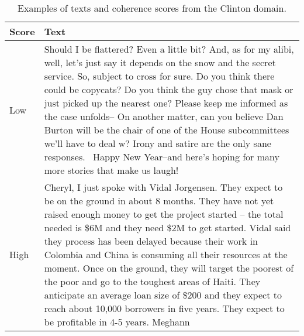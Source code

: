 \documentclass[11pt,a4paper]{article}
\begin{document}
\begin{table*}[htb]
\begin{center}
\begin{footnotesize}
\begin{tabular}{@{}l@{\hspace{1em}}p{14.8cm}@{}}
\toprule
Score & Text \\
\midrule
Low & Should I be flattered? Even a little bit? And, as for my alibi, well, let's just say it depends on the snow and the secret service. So, subject to cross for sure. Do you think there could be copycats? Do you think the guy chose that mask or just picked up the nearest one? Please keep me informed as the case unfolds--
\newline
On another matter, can you believe Dan Burton will be the chair of one of the House subcommittees we'll have to deal w? Irony and satire are the only sane responses.
\newline\
Happy New Year--and here's hoping for many more stories that make us laugh!\\
High & Cheryl,
\newline
I just spoke with Vidal Jorgensen. They expect to be on the ground in about 8 months. They have not yet raised enough money to get the project started -- the total needed is \$6M and they need \$2M to get started. Vidal said they process has been delayed because their work in Colombia and China is consuming all their resources at the moment. Once on the ground, they will target the poorest of the poor and go to the toughest areas of Haiti. They anticipate an average loan size of \$200 and they expect to reach about 10,000 borrowers in five years. They expect to be profitable in 4-5 years.
\newline
Meghann\\
\bottomrule
\end{tabular}
\caption{Examples of texts and coherence scores from the Clinton domain.}
\label{tab:examples}
\end{footnotesize}
\end{center}
\end{table*}
\end{document}
